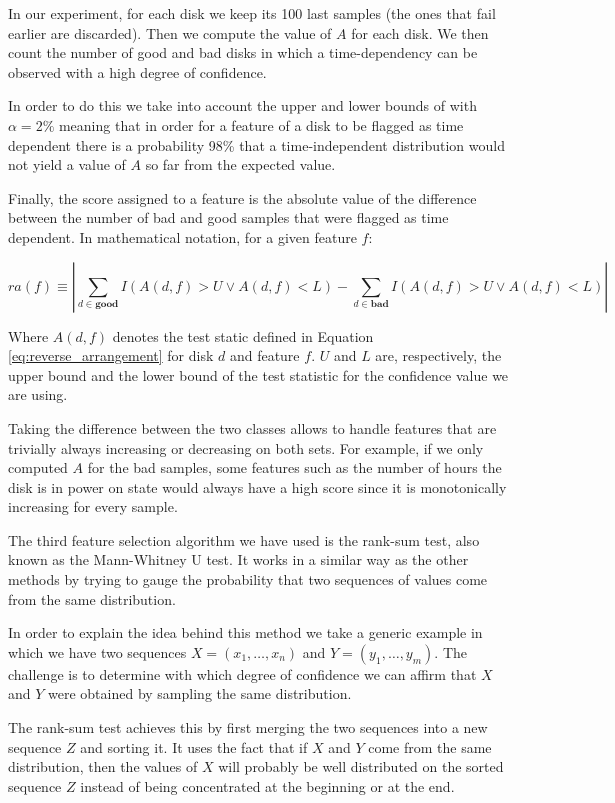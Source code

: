 In our experiment, for each disk we keep its 100 last samples (the ones that fail earlier are discarded).
Then we compute the value of $A$ for each disk.
We then count the number of good and bad disks in which a time-dependency can be observed with a high degree of confidence.

In order to do this we take into account the upper and lower bounds of \cite{bendat2011random} with $\alpha = 2\%$ meaning that in order for a feature of a disk to be flagged as time dependent there is a probability 98\% that a time-independent distribution would not yield a value of $A$ so far from the expected value.

Finally, the score assigned to a feature is the absolute value of the difference between the number of bad and good samples that were flagged as time dependent.
In mathematical notation, for a given feature $f$:

\begin{equation}
  ra(f) \equiv \left| \sum_{d \in \mathbf{good}} I(A(d, f) > U \lor A(d, f) < L) - \sum_{d \in \mathbf{bad}} I(A(d, f) > U \lor A(d, f) < L) \right|
\end{equation}

Where $A(d, f)$ denotes the test static defined in Equation \ref{eq:reverse_arrangement} for disk $d$ and feature $f$.
$U$ and $L$ are, respectively, the upper bound and the lower bound of the test statistic for the confidence value we are using.

Taking the difference between the two classes allows to handle features that are trivially always increasing or decreasing on both sets.
For example, if we only computed $A$ for the bad samples, some features such as the number of hours the disk is in power on state would always have a high score since it is monotonically increasing for every sample.

The third feature selection algorithm we have used is the rank-sum test, also known as the Mann-Whitney U test.
It works in a similar way as the other methods by trying to gauge the probability that two sequences of values come from the same distribution.

In order to explain the idea behind this method we take a generic example in which we have two sequences $X = (x_1,\dots,x_n)$ and $Y = (y_1,\dots,y_m)$.
The challenge is to determine with which degree of confidence we can affirm that $X$ and $Y$ were obtained by sampling the same distribution.

The rank-sum test achieves this by first merging the two sequences into a new sequence $Z$ and sorting it.
It uses the fact that if $X$ and $Y$ come from the same distribution, then the values of $X$ will probably be well distributed on the sorted sequence $Z$ instead of being concentrated at the beginning or at the end.

